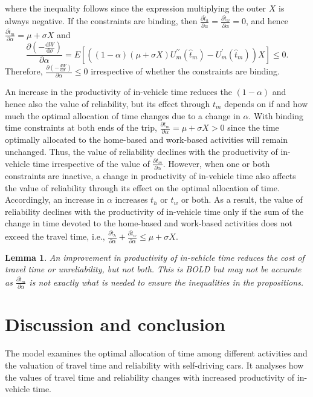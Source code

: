 \documentclass[12pt,a4paper,british]{article}
\makeatletter
\newenvironment{proof}[1][\proofname]{\par
    \normalfont\topsep6\p@\@plus6\p@\relax
    \trivlist
    \itemindent\parindent
    \item[\hskip\labelsep
          \scshape
      #1]\ignorespaces
  }{%
    \endtrivlist\@endpefalse
  }
\providecommand{\proofname}{Proof}
\newtheorem{lemma}{Lemma}[section]
\makeatother
\begin{document}
\begin{proof}
\begin{align*}
\end{align*}
where the inequality follows since the expression multiplying the outer $X$ is always negative. If the constraints are binding, then $\frac{\partial\hat{t}_{h}}{\partial\alpha}=\frac{\partial\hat{t}_{w}}{\partial\alpha}=0$, and hence $\frac{\partial\hat{t}_{m}}{\partial\alpha}=\mu+\sigma X$ and
\begin{equation*}
\frac{\partial\left(-\frac{\mathrm{d}W}{\mathrm{d}\sigma}\right)}{\partial\alpha}=E\left[\left(\left(1-\alpha\right)\left(\mu+\sigma X\right)U_{m}^{\prime\prime}\left(\hat{t}_{m}\right)-U_{m}^{\prime}\left(\hat{t}_{m}\right)\right)X\right] \leq 0.
\end{equation*}
Therefore, $\frac{\partial\left(-\frac{\mathrm{d}W}{\mathrm{d}\sigma}\right)}{\partial\alpha} \leq 0 $ irrespective of whether the constraints are binding.
\end{proof}

An increase in the productivity of in-vehicle time reduces the $\left(1-\alpha\right)$ and hence also the value of reliability, but its effect through $t_{m}$ depends on if and how much the optimal allocation of time changes due to a change in $\alpha$. With binding time constraints at both ends of the trip, $\frac{\partial t_{m}}{\partial\alpha}=\mu+\sigma X>0$ since the time optimally allocated to the home-based and work-based activities will remain unchanged. Thus, the value of reliability declines with the productivity of in-vehicle time irrespective of the value of $\frac{\partial t_{m}}{\partial\alpha}$. However, when one or both constraints are inactive, a change in productivity of in-vehicle time also affects the value of reliability through its effect on the optimal allocation of time. Accordingly, an increase in $\alpha$ increases $t_{h}$ or $t_{w}$ or both. As a result, the value of reliability declines with the productivity of in-vehicle time only if the sum of the change in time devoted to the home-based and work-based activities does not exceed the travel time, i.e., $\frac{\partial\hat{t}_{h}}{\partial\alpha}+\frac{\partial\hat{t}_{w}}{\partial\alpha}\leq\mu+\sigma X$.


\begin{lemma}
An improvement in productivity of in-vehicle time reduces the cost of travel time or unreliability, but not both. This is BOLD but may not be accurate as $\frac{\partial \hat{t}_m}{\partial \alpha}$ is not exactly what is needed to ensure the inequalities in the propositions.
\end{lemma}

\section{Discussion and conclusion}

The model examines the optimal allocation of time among different activities and the valuation of travel time and reliability with self-driving cars. It analyses how the values of travel time and reliability changes with increased productivity of in-vehicle time.

\clearpage

% 


\end{document}
